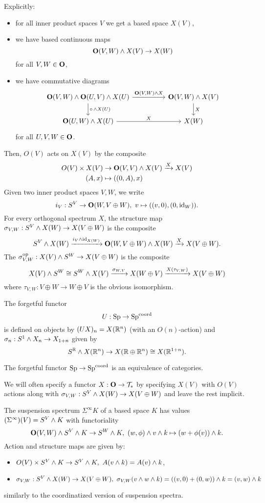 Explicitly:
\begin{itemize}
    \item for all inner product spaces $V$ we get a based space $X(V)$,
    \item we have based continuous maps
    \[\boldsymbol{\mathrm{O}}(V,W)\wedge X(V)\to X(W)\]
    for all $V,W\in\boldsymbol{\mathrm{O}}$,
    \item we have commutative diagrams
    \[
    \begin{tikzcd}[column sep=huge]
    {\Or(V,W)\smsh\Or(U,V)\smsh X(U)} \ar[d,"\circ\,\smsh X(U)"] \ar[r,"{\Or(V,W)\smsh X}"] & {\Or(V,W)\smsh X(V)} \ar[d,"X"]\\
    {\Or(U,W)\smsh X(U)} \ar[r,"X"] & X(W)
    \end{tikzcd}
    \]
    for all $U,V,W\in\boldsymbol{\mathrm{O}}$.
\end{itemize}
Then, $O(V)$ acts on $X(V)$ by the composite
\begin{align*}
    O(V)\times X(V)&\to\boldsymbol{\mathrm{O}}(V,V)\wedge X(V)\xrightarrow{X}X(V)\\
    (A,x)&\mapsto((0,A),x)
\end{align*}
Given two inner product spaces $V,W$, we write
\[i_V:S^V\to\Or(W,V\oplus W),\ v\mapsto((v,0),(0,\id_W)).\]
For every orthogonal spectrum $X$, the structure map $\sigma_{V,W}:S^V\wedge X(W)\to X(V\oplus W)$ is the composite
\[S^V\wedge X(W)\xrightarrow{i_V\wedge\operatorname{id}_{X(W)}}\boldsymbol{\mathrm{O}}(W,V\oplus W)\wedge X(W)\xrightarrow{X}X(V\oplus W).\]
The  $\sigma_{V,W}^{\operatorname{op}}:X(V)\wedge S^W\to X(V\oplus W)$ is the composite
\[X(V)\wedge S^W\cong S^W\wedge X(V)\xrightarrow{\sigma_{W,V}}X(W\oplus V)\xrightarrow{X(\tau_{V,W})}X(V\oplus W)\]
where $\tau_{V,W}:V\oplus W\to W\oplus V$ is the obvious isomorphism.

The forgetful functor
\[U:{\normalfont\textup{Sp}}\to{\normalfont\textup{Sp}}^\text{\upshape coord}\]
is defined on objects by $(UX)_n=X({\mathbb R}^n)$ (with an $O(n)$-action) and $\sigma_n:S^1\wedge X_n\to X_{1+n}$ given by
\[S^{\mathbb R}\wedge X({\mathbb R}^n)\to X({\mathbb R}\oplus{\mathbb R}^n)\cong X({\mathbb R}^{1+n}).\]

\begin{theorem}[AT2sheet2.2]
The forgetful functor ${\normalfont\textup{Sp}}\to{\normalfont\textup{Sp}}^\text{\upshape coord}$ is an equivalence of categories.
\end{theorem}

We will often specify a functor $X:\boldsymbol{\mathrm{O}}\to\mathcal{T}_*$ by specifying $X(V)$ with $O(V)$ actions along with $\sigma_{V,W}:S^V\wedge X(W)\to X(V\oplus W)$ and leave the rest implicit.

The suspension spectrum $\Sigma^\infty K$ of a based space $K$ has values $(\Sigma^\infty)(V)=S^V\wedge K$ with functoriality
\[\Or(V,W)\smsh S^V\smsh K\to S^W\smsh K,\ (w,\phi)\smsh v\smsh k\mapsto (w+\phi(v))\smsh k.\]
Action and structure maps are given by:
\begin{itemize}
    \item $O(V)\times S^V\smsh K\to S^V\smsh K,\ A(v\smsh k)=A(v)\smsh k$,
    \item $\sigma_{V,W}:S^V\wedge X(W)\to X(V\oplus W),\ \sigma_{V,W}(v\wedge w\wedge k)=((v,0)+(0,w))\wedge k=(v,w)\wedge k$
\end{itemize}
similarly to the coordinatized version of suspension spectra.

